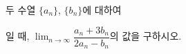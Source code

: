 두 수열 $\{a_n\}$, $\{b_n\}$에 대하여 \par\smallskip{}\par\smallskip\noindent 일 때, $\displaystyle\lim_{n\to\infty}\dfrac{a_n+3b_n}{2a_n-b_n}$의 값을 구하시오.

